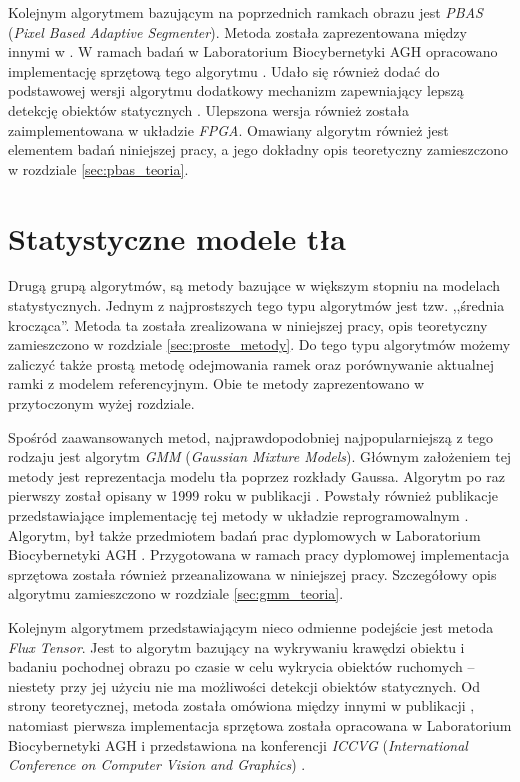 Kolejnym algorytmem bazującym na poprzednich ramkach obrazu jest \textit{PBAS} (\textit{Pixel Based Adaptive Segmenter}). 
Metoda została zaprezentowana między innymi w \cite{hofmann_12}. 
W ramach badań w Laboratorium Biocybernetyki AGH opracowano implementację sprzętową tego algorytmu \cite{kryjak_13_pbas}. 
Udało się również dodać do podstawowej wersji algorytmu dodatkowy mechanizm zapewniający lepszą detekcję obiektów statycznych \cite{kryjak_14_pbas}.
Ulepszona wersja również została zaimplementowana w układzie \textit{FPGA}. 
Omawiany algorytm również jest elementem badań niniejszej pracy, a jego dokładny opis teoretyczny zamieszczono w rozdziale \ref{sec:pbas_teoria}.

\section{Statystyczne modele tła}
\label{sec:model_inne}

Drugą grupą algorytmów, są metody bazujące w większym stopniu na modelach statystycznych. 
Jednym z najprostszych tego typu algorytmów jest tzw. ,,średnia krocząca''. 
Metoda ta została zrealizowana w niniejszej pracy, opis teoretyczny zamieszczono w rozdziale \ref{sec:proste_metody}. Do tego typu algorytmów możemy zaliczyć także prostą metodę odejmowania ramek oraz porównywanie aktualnej ramki z modelem referencyjnym. Obie te metody zaprezentowano w przytoczonym wyżej rozdziale.
 
Spośród zaawansowanych metod, najprawdopodobniej najpopularniejszą z tego rodzaju jest algorytm \textit{GMM} (\textit{Gaussian Mixture Models}). 
Głównym założeniem tej metody jest reprezentacja modelu tła poprzez rozkłady Gaussa. 
Algorytm po raz pierwszy został opisany w 1999 roku w publikacji \cite{Stauffer_Grimson_99}. 
Powstały również publikacje przedstawiające implementację tej metody w układzie reprogramowalnym \cite{Genovese_Napoli_13}. 
Algorytm, był także przedmiotem badań prac dyplomowych w Laboratorium Biocybernetyki AGH \cite{janus_15, piszczek_15}. 
Przygotowana w ramach pracy dyplomowej \cite{piszczek_15} implementacja sprzętowa została również przeanalizowana w niniejszej pracy.
Szczegółowy opis algorytmu zamieszczono w rozdziale \ref{sec:gmm_teoria}.

Kolejnym algorytmem przedstawiającym nieco odmienne podejście jest metoda \textit{Flux Tensor}. 
Jest to algorytm bazujący na wykrywaniu krawędzi obiektu i badaniu pochodnej obrazu po czasie w celu wykrycia obiektów ruchomych -- niestety przy jej użyciu nie ma możliwości detekcji obiektów statycznych. 
Od strony teoretycznej, metoda została omówiona między innymi w publikacji \cite{palaniappan_11}, natomiast pierwsza implementacja sprzętowa została opracowana w Laboratorium Biocybernetyki AGH i przedstawiona na konferencji \textit{ICCVG} (\textit{International Conference on Computer Vision and Graphics}) \cite{janus_15, janus_16_flux}. 

